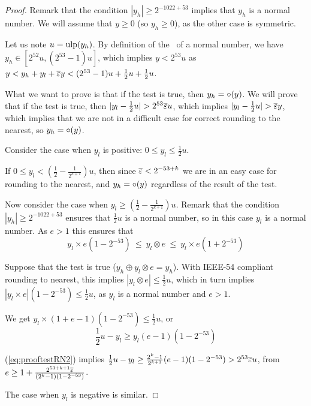 \begin{proof}

  Remark that the condition $|y_h|\ge 2^{-1022+53}$ implies that $y_h$ is a normal
  number. We will assume that $y\ge0$ (so $y_h\ge0$), as the other
  case is symmetric.
  
  Let us note $u=\mbox{ulp}(y_h)$. By definition of the \ulp\ of a normal number, we have $y_h
  \in [2^{52}u, (2^{53}-1)u]$, which implies $y<2^{53}u$ as $y < y_h + y_l +{\overline{\varepsilon}} y
  < (2^{53}-1)u +\frac{1}{2}u +\frac{1}{2}u$.

  What we want to prove is that if the test is true, then $y_h =
  \circ(y)$. We will prove that  if the test is true, then $|y_l-\frac{1}{2}u| > 2^{53}{\overline{\varepsilon}}
  u$, which implies $|y_l-\frac{1}{2}u| > {\overline{\varepsilon}} y$, which implies
  that we are not in a difficult case for correct rounding to the
  nearest, so $y_h = \circ(y)$.

  Consider the case when $y_l$ is positive:  $0\le y_l \le \frac{1}{2}u$.

  If $0 \le y_l < (\frac{1}{2} - \frac{1}{2^{k+1}})u$, then since
    ${\overline{\varepsilon}}<2^{-53+k}$ we are in an easy case for rounding to the
    nearest, and $y_h = \circ(y)$ regardless of the result of the test.

    Now consider the case when $y_l \ge (\frac{1}{2} - \frac{1}{2^{k+1}})u$.
    Remark that the condition $|y_h|\ge 2^{-1022+53}$ ensures that
    $\frac{1}{2}u$ is a normal number, so in this case
    $y_l$ is a normal number. As $e>1$ this ensures that
    $$y_l\times e(1-2^{-53})\ \le\ y_l \otimes e\ \le\ y_l\times e(1+2^{-53})$$


  Suppose that the test is true ($y_h \oplus y_l \otimes e = y_h$). 
  With IEEE-54 compliant rounding to
  nearest, this implies $|y_l \otimes e|
  \le \frac{1}{2}u$, which in turn implies $|y_l \times e|
  (1-2^{-53}) \le \frac{1}{2}u$, as $y_l$ is a normal number and $e>1$. 
  
  We get $y_l \times (1+e-1)(1-2^{-53}) \le \frac{1}{2}u$, or
  \begin{equation}
  \frac{1}{2}u - y_l \ge y_l (e-1)(1-2^{-53})\label{eq:prooftestRN2}
  \end{equation}  

(\ref{eq:prooftestRN2}) implies
    $\frac{1}{2}u - y_l \ge \frac{2^{k}-1}{2^{k+1}} (e-1)(1-2^{-53}) >
    2^{53}{\overline{\varepsilon}} u$, from $e\ge 1+
    \frac{2^{53+k+1}{\overline{\varepsilon}}}{(2^{k}-1)(1-2^{-53})}$.

  The case when $y_l$ is negative is similar.
\end{proof}




